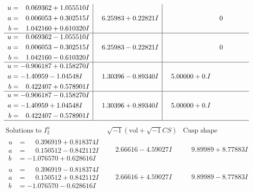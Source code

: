 \documentclass[1p]{elsarticle_modified}
\theoremstyle{definition}
\newcommand{\I}{\sqrt{-1}}
\begin{document}
$$\begin{array}{c|c|c}
\begin{aligned}
u &= \phantom{-}0.069362 + 1.055510 I \\
a &= \phantom{-}0.006053 + 0.302515 I \\
b &= \phantom{-}1.042160 + 0.610320 I\end{aligned}
 & \phantom{-}6.25983 + 0.22821 I & \phantom{-0.000000 } 0 \\ \hline\begin{aligned}
u &= \phantom{-}0.069362 - 1.055510 I \\
a &= \phantom{-}0.006053 - 0.302515 I \\
b &= \phantom{-}1.042160 - 0.610320 I\end{aligned}
 & \phantom{-}6.25983 - 0.22821 I & \phantom{-0.000000 } 0 \\ \hline\begin{aligned}
u &= -0.906187 + 0.158270 I \\
a &= -1.40959 - 1.04548 I \\
b &= \phantom{-}0.422407 + 0.578901 I\end{aligned}
 & \phantom{-}1.30396 - 0.89340 I & \phantom{-}5.00000 + 0. I\phantom{ +0.000000I} \\ \hline\begin{aligned}
u &= -0.906187 - 0.158270 I \\
a &= -1.40959 + 1.04548 I \\
b &= \phantom{-}0.422407 - 0.578901 I\end{aligned}
 & \phantom{-}1.30396 + 0.89340 I & \phantom{-}5.00000 + 0. I\phantom{ +0.000000I}\\
 \hline 
 \end{array}$$\newpage$$\begin{array}{c|c|c}  
\text{Solutions to }I^u_{2}& \I (\text{vol} + \sqrt{-1}CS) & \text{Cusp shape}\\
 \hline 
\begin{aligned}
u &= \phantom{-}0.396919 + 0.818374 I \\
a &= \phantom{-}0.150512 - 0.842112 I \\
b &= -1.076570 + 0.628616 I\end{aligned}
 & \phantom{-}2.66616 - 4.59027 I & \phantom{-}9.89989 + 8.77883 I \\ \hline\begin{aligned}
u &= \phantom{-}0.396919 - 0.818374 I \\
a &= \phantom{-}0.150512 + 0.842112 I \\
b &= -1.076570 - 0.628616 I\end{aligned}
 & \phantom{-}2.66616 + 4.59027 I & \phantom{-}9.89989 - 8.77883 I \\ \hline\begin{aligned}

\end{aligned}
\end{array}$$
\end{document}
